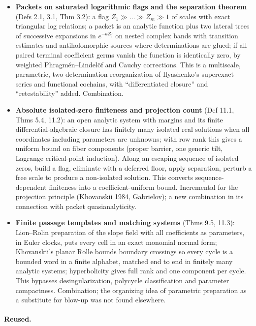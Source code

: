 \documentclass[11pt]{article}
\begin{document}
\begin{itemize}
\item \textbf{Packets on saturated logarithmic flags and the separation theorem} (Defs 2.1, 3.1, Thm 3.2): a flag $Z_1\gg\dots\gg Z_m\gg1$ of scales with exact triangular log relations; a packet is an analytic function plus two lateral trees of successive expansions in $e^{-aZ_j}$ on nested complex bands with transition estimates and antiholomorphic sources where determinations are glued; if all paired terminal coefficient germs vanish the function is identically zero, by weighted Phragmén--Lindelöf and Cauchy corrections. This is a multiscale, parametric, two-determination reorganization of Ilyashenko's superexact series and functional cochains, with ``differentiated closure'' and ``retestability'' added. Combination.
\item \textbf{Absolute isolated-zero finiteness and projection count} (Def 11.1, Thms 5.4, 11.2): an open analytic system with margins and its finite differential-algebraic closure has finitely many isolated real solutions when all coordinates including parameters are unknowns; with row rank this gives a uniform bound on fiber components (proper barrier, one generic tilt, Lagrange critical-point induction). Along an escaping sequence of isolated zeros, build a flag, eliminate with a deferred floor, apply separation, perturb a free scale to produce a non-isolated solution. This converts sequence-dependent finiteness into a coefficient-uniform bound. Incremental for the projection principle (Khovanskii 1984, Gabrielov); a new combination in its connection with packet quasianalyticity.
\item \textbf{Finite passage templates and matching systems} (Thms 9.5, 11.3): Lion--Rolin preparation of the slope field with all coefficients as parameters, in Euler clocks, puts every cell in an exact monomial normal form; Khovanskii's planar Rolle bounds boundary crossings so every cycle is a bounded word in a finite alphabet, matched end to end in finitely many analytic systems; hyperbolicity gives full rank and one component per cycle. This bypasses desingularization, polycycle classification and parameter compactness. Combination; the organizing idea of parametric preparation as a substitute for blow-up was not found elsewhere.
\end{itemize}

\paragraph{Reused.}
\end{document}
